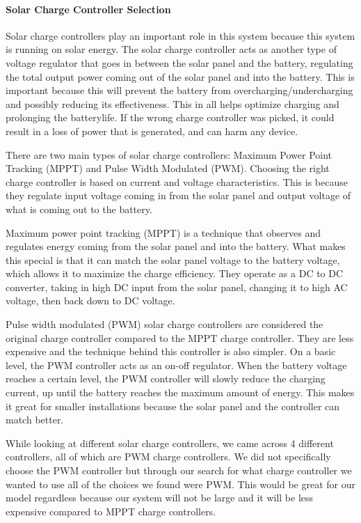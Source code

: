 \paragraph{Solar Charge Controller Selection}
Solar charge controllers play an important role in this system because this system is running on solar energy. The solar charge controller acts as another type of voltage regulator that goes in between the solar panel and the battery, regulating the total output power coming out of the solar panel and into the battery. This is important because this will prevent the battery from overcharging/undercharging and possibly reducing its effectiveness. This in all helps optimize charging and prolonging the batterylife. If the wrong charge controller was picked, it could result in a loss of power that is generated, and can harm any device. \par
There are two main types of solar charge controllers: Maximum Power Point Tracking (MPPT) and Pulse Width Modulated (PWM). Choosing the right charge controller is based on current and voltage characteristics. This is because they regulate input voltage coming in from the solar panel and output voltage of what is coming out to the battery.\par
Maximum power point tracking (MPPT) is a technique that observes and regulates energy coming from the solar panel and into the battery. What makes this special is that it can match the solar panel voltage to the battery voltage, which allows it to maximize the charge efficiency. They operate as a DC to DC converter, taking in high DC input from the solar panel, changing it to high AC voltage, then back down to DC voltage.\par
Pulse width modulated (PWM) solar charge controllers are considered the original charge controller compared to the MPPT charge controller. They are less expensive and the technique behind this controller is also simpler. On a basic level, the PWM controller acts as an on-off regulator. When the battery voltage reaches a certain level, the PWM controller will slowly reduce the charging current, up until the battery reaches the maximum amount of energy. This makes it great for smaller installations because the solar panel and the controller can match better. \par
While looking at different solar charge controllers, we came across 4 different controllers, all of which are PWM charge controllers. We did not specifically choose the PWM controller but through our search for what charge controller we wanted to use all of the choices we found were PWM. This would be great for our model regardless because our system will not be large and it will be less expensive compared to MPPT charge controllers.\par
